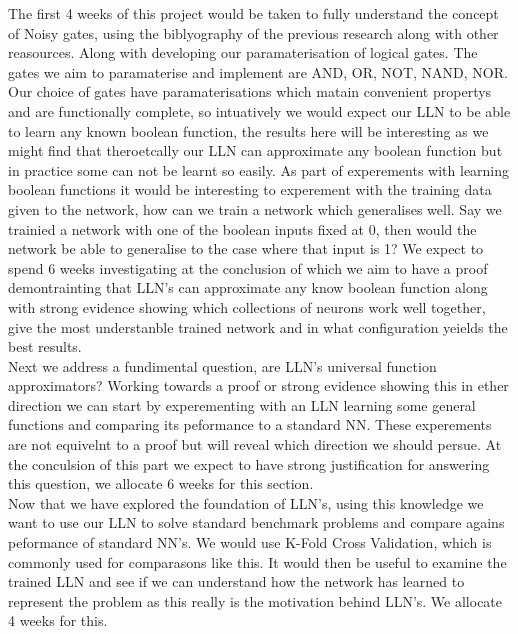 \documentclass[11pt, a4paper, twoside, openright]{report}
\begin{document}
The first 4 weeks of this project would be taken to fully understand the concept of Noisy gates, using the biblyography of the previous research along with other reasources. Along with developing our paramaterisation of logical gates. The gates we aim to paramaterise and implement are AND, OR, NOT, NAND, NOR. \\

Our choice of gates have paramaterisations which matain convenient propertys and are functionally complete, so intuatively we would expect our LLN to be able to learn any known boolean function, the results here will be interesting as we might find that theroetcally our LLN can approximate any boolean function but in practice some can not be learnt so easily. As part of experements with learning boolean functions it would be interesting to experement with the training data given to the network, how can we train a network which generalises well. Say we trainied a network with one of the boolean inputs fixed at 0, then would the network be able to generalise to the case where that input is 1? We expect to spend 6 weeks investigating at the conclusion of which we aim to have a proof demontrainting that LLN's can approximate any know boolean function along with strong evidence showing which collections of neurons work well together, give the most understanble trained network and in what configuration yeields the best results. \\

Next we address a fundimental question, are LLN's universal function approximators? Working towards a proof or strong evidence showing this in ether direction we can start by experementing with an LLN learning some general functions and comparing its peformance to a standard NN. These experements are not equivelnt to a proof but will reveal which direction we should persue. At the conculsion of this part we expect to have strong justification for answering this question, we allocate 6 weeks for this section. \\

Now that we have explored the foundation of LLN's, using this knowledge we want to use our LLN to solve standard benchmark problems and compare agains peformance of standard NN's. We would use K-Fold Cross Validation, which is commonly used for comparasons like this. It would then be useful to examine the trained LLN and see if we can understand how the network has learned to represent the problem as this really is the motivation behind LLN's. We allocate 4 weeks for this. \\
\end{document}
